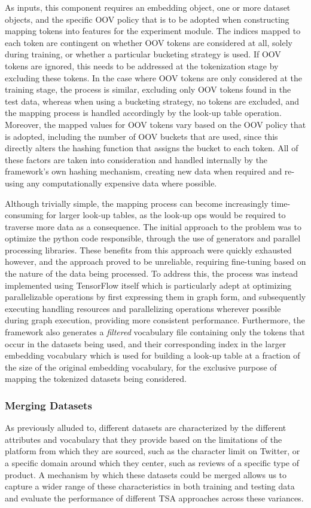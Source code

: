 \documentclass[12pt, a4paper]{report}
\theoremstyle{definition}
\theoremstyle{definition}%
\theoremstyle{definition}%
\theoremstyle{definition}%
\theoremstyle{definition}%
\theoremstyle{definition}%
\begin{document}
As inputs, this component requires an embedding object, one or more dataset objects, and the specific OOV policy that is to be adopted when constructing mapping tokens into features for the experiment module. The indices mapped to each token are contingent on whether OOV tokens are considered at all, solely during training, or whether a particular bucketing strategy is used. If OOV tokens are ignored, this needs to be addressed at the tokenization stage by excluding these tokens. In the case where OOV tokens are only considered at the training stage, the process is similar, excluding only OOV tokens found in the test data, whereas when using a bucketing strategy, no tokens are excluded, and the mapping process is handled accordingly by the look-up table operation. Moreover, the mapped values for OOV tokens vary based on the OOV policy that is adopted, including the number of OOV buckets that are used, since this directly alters the hashing function that assigns the bucket to each token. All of these factors are taken into consideration and handled internally by the framework's own hashing mechanism, creating new data when required and re-using any computationally expensive data where possible.

Although trivially simple, the mapping process can become increasingly time-consuming for larger look-up tables, as the look-up ops would be required to traverse more data as a consequence. The initial approach to the problem was to optimize the python code responsible, through the use of generators and parallel processing libraries. These benefits from this approach were quickly exhausted however, and the approach proved to be unreliable, requiring fine-tuning based on the nature of the data being processed. To address this, the process was instead implemented using TensorFlow itself which is particularly adept at optimizing parallelizable operations by first expressing them in graph form, and subsequently executing handling resources and parallelizing operations wherever possible during graph execution, providing more consistent performance. Furthermore, the framework also generates a \textit{filtered} vocabulary file containing only the tokens that occur in the datasets being used, and their corresponding index in the larger embedding vocabulary which is used for building a look-up table at a fraction of the size of the original embedding vocabulary, for the exclusive purpose of mapping the tokenized datasets being considered.

\subsubsection{Merging Datasets}
As previously alluded to, different datasets are characterized by the different attributes and vocabulary that they provide based on the limitations of the platform from which they are sourced, such as the character limit on Twitter, or a specific domain around which they center, such as reviews of a specific type of product. A mechanism by which these datasets could be merged allows us to capture a wider range of these characteristics in both training and testing data and evaluate the performance of different TSA approaches across these variances.
\end{document}

